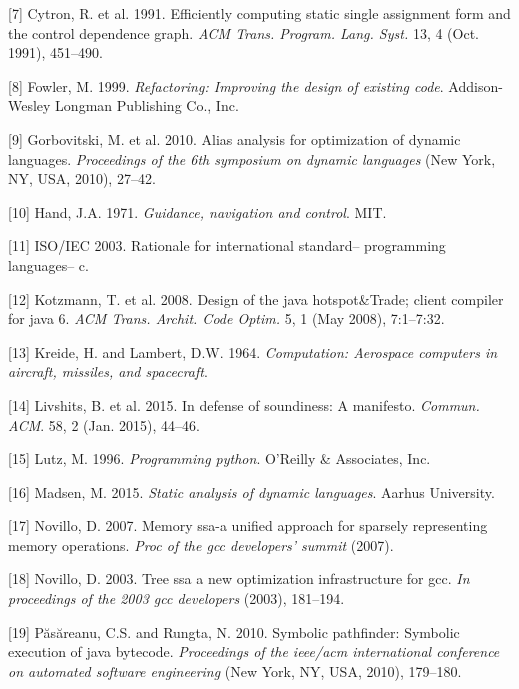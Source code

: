 \documentclass[]{article}
\begin{document}
\hypertarget{ref-increment}{}
{[}7{]} Cytron, R. et al. 1991. Efficiently computing static single
assignment form and the control dependence graph. \emph{ACM Trans.
Program. Lang. Syst.} 13, 4 (Oct. 1991), 451--490.

\hypertarget{ref-refactor}{}
{[}8{]} Fowler, M. 1999. \emph{Refactoring: Improving the design of
existing code}. Addison-Wesley Longman Publishing Co., Inc.

\hypertarget{ref-interpret}{}
{[}9{]} Gorbovitski, M. et al. 2010. Alias analysis for optimization of
dynamic languages. \emph{Proceedings of the 6th symposium on dynamic
languages} (New York, NY, USA, 2010), 27--42.

\hypertarget{ref-nasa3}{}
{[}10{]} Hand, J.A. 1971. \emph{Guidance, navigation and control}. MIT.

\hypertarget{ref-C99}{}
{[}11{]} ISO/IEC 2003. Rationale for international standard--
programming languages-- c.

\hypertarget{ref-hotspot}{}
{[}12{]} Kotzmann, T. et al. 2008. Design of the java hotspot\&Trade;
client compiler for java 6. \emph{ACM Trans. Archit. Code Optim.} 5, 1
(May 2008), 7:1--7:32.

\hypertarget{ref-nasa1}{}
{[}13{]} Kreide, H. and Lambert, D.W. 1964. \emph{Computation: Aerospace
computers in aircraft, missiles, and spacecraft}.

\hypertarget{ref-unsound}{}
{[}14{]} Livshits, B. et al. 2015. In defense of soundiness: A
manifesto. \emph{Commun. ACM}. 58, 2 (Jan. 2015), 44--46.

\hypertarget{ref-lutz}{}
{[}15{]} Lutz, M. 1996. \emph{Programming python}. O'Reilly \&
Associates, Inc.

\hypertarget{ref-madsen}{}
{[}16{]} Madsen, M. 2015. \emph{Static analysis of dynamic languages}.
Aarhus University.

\hypertarget{ref-memoryssa}{}
{[}17{]} Novillo, D. 2007. Memory ssa-a unified approach for sparsely
representing memory operations. \emph{Proc of the gcc developers'
summit} (2007).

\hypertarget{ref-treessa}{}
{[}18{]} Novillo, D. 2003. Tree ssa a new optimization infrastructure
for gcc. \emph{In proceedings of the 2003 gcc developers} (2003),
181--194.

\hypertarget{ref-symb2}{}
{[}19{]} Păsăreanu, C.S. and Rungta, N. 2010. Symbolic pathfinder:
Symbolic execution of java bytecode. \emph{Proceedings of the ieee/acm
international conference on automated software engineering} (New York,
NY, USA, 2010), 179--180.
\end{document}
